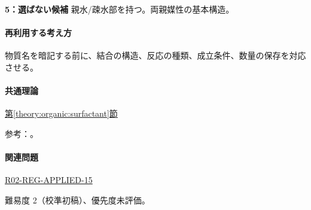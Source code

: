 \noindent\textbf{5：選ばない候補} 親水/疎水部を持つ。両親媒性の基本構造。\par

\paragraph{再利用する考え方} 物質名を暗記する前に、結合の構造、反応の種類、成立条件、数量の保存を対応させる。

\paragraph{共通理論} \hyperref[theory:organic:surfactant]{第\ref*{theory:organic:surfactant}節}

\par 参考：\cite{organic_cmc}。

\paragraph{関連問題} \hyperref[q:r02-reg-applied-15]{R02-REG-APPLIED-15}

\par 難易度 2（校準初稿）、優先度未評価。
